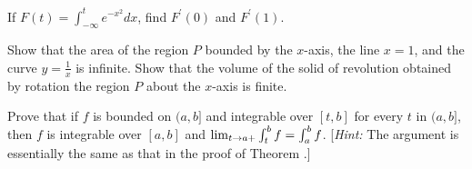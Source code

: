 \begin{exercises}
If $F(t) = \int_{-\infty}^t e^{-x^2} dx$,
find $F^\prime(0)$ and $F^\prime(1)$.

\begin{exenum}
\x
Show that the area of the region $P$ bounded by
the $x$-axis, the line $x=1$, and the curve
$y=\frac1x$ is infinite.
\x
Show that the volume of the solid of revolution
obtained by rotation the region $P$
about the $x$-axis is finite.
\end{exenum}

Prove that if $f$ is bounded on $(a,b]$ and integrable
over $[t,b]$ for every $t$ in $(a,b]$, then $f$
is integrable over $[a,b]$ and
$\lim_{t\rightarrow a+} \int_t^b f = \int_a^b f$.
[\emph{Hint:} The argument is essentially the same
as that in the proof of Theorem .]

\end{exercises}

